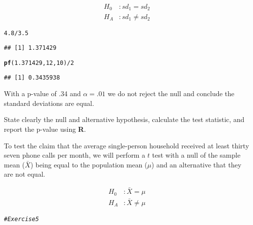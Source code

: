 \documentclass[12pt]{article}\usepackage[]{graphicx}\usepackage[]{color}
\makeatletter
\newcommand{\hlnum}[1]{\textcolor[rgb]{0.686,0.059,0.569}{#1}}%
\newcommand{\hlcom}[1]{\textcolor[rgb]{0.678,0.584,0.686}{\textit{#1}}}%
\newcommand{\hlopt}[1]{\textcolor[rgb]{0,0,0}{#1}}%
\newcommand{\hlstd}[1]{\textcolor[rgb]{0.345,0.345,0.345}{#1}}%
\newcommand{\hlkwd}[1]{\textcolor[rgb]{0.737,0.353,0.396}{\textbf{#1}}}%
\newenvironment{kframe}{%
 \def\at@end@of@kframe{}%
 \ifinner\ifhmode%
  \def\at@end@of@kframe{\end{minipage}}%
  \begin{minipage}{\columnwidth}%
 \fi\fi%
 \def\FrameCommand##1{\hskip\@totalleftmargin \hskip-\fboxsep
 \colorbox{shadecolor}{##1}\hskip-\fboxsep
     \hskip-\linewidth \hskip-\@totalleftmargin \hskip\columnwidth}%
 \MakeFramed {\advance\hsize-\width
   \@totalleftmargin\z@ \linewidth\hsize
   \@setminipage}}%
 {\par\unskip\endMakeFramed%
 \at@end@of@kframe}
\newenvironment{knitrout}{}{} %
\newenvironment{exercise}[2][Exercise]{\begin{trivlist}
\item[\hskip \labelsep {\bfseries #1}\hskip \labelsep {\bfseries #2.}]}{\end{trivlist}}
\newenvironment{Answer}[2][Answer]{\begin{trivlist}
\item[\hskip \labelsep {\bfseries #1}\hskip \labelsep {\bfseries #2.}]}{\end{trivlist}}
\makeatother
\begin{document}
\begin{Answer}{2}
\begin{Answer}{4}
\begin{align}
H_0&:sd_1=sd_2\\
H_A&:sd_1\neq{sd_2}
\end{align}

\begin{knitrout}
\color{fgcolor}\begin{kframe}
\begin{alltt}
\hlnum{4.8}\hlopt{/}\hlnum{3.5}
\end{alltt}
\begin{verbatim}
## [1] 1.371429
\end{verbatim}
\begin{alltt}
\hlkwd{pf}\hlstd{(}\hlnum{1.371429}\hlstd{,}\hlnum{12}\hlstd{,}\hlnum{10}\hlstd{)}\hlopt{/}\hlnum{2}
\end{alltt}
\begin{verbatim}
## [1] 0.3435938
\end{verbatim}
\end{kframe}
\end{knitrout}
With a p-value of .34 and $\alpha=.01$ we do not reject the null and conclude the standard deviations are equal.


\end{Answer}
\begin{exercise}{5} State clearly the null and alternative hypothesis, calculate the test statistic, and report the p-value using \textbf{R}.
\end{exercise}

\begin{Answer}{5}
To test the claim that the average single-person household received at least thirty seven phone calls per month, we will perform a $t$ test with a null of the sample mean ($\bar{X}$) being equal to the population mean ($\mu$) and an alternative that they are not equal.

\begin{align}
H_0&:\bar{X}=\mu\\
H_A&:\bar{X}\neq{\mu}
\end{align}

\begin{knitrout}
\color{fgcolor}\begin{kframe}
\begin{alltt}
\hlcom{# Exercise 5}


\end{alltt}
\end{kframe}
\end{knitrout}
\end{Answer}
\end{Answer}
\end{document}
